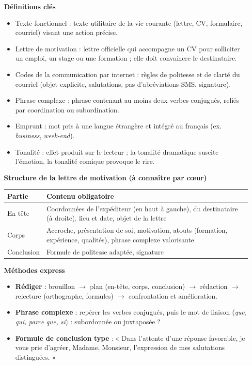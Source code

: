 \documentclass[11pt]{article}
\newcommand{\cle}[1]{{\popxbold\color{popdark}#1}}
\begin{document}
\begin{bilan}
\textbf{Définitions clés}
\begin{itemize}
  \item \cle{Texte fonctionnel} : texte utilitaire de la vie courante (lettre, CV, formulaire, courriel) visant une action précise.
  \item \cle{Lettre de motivation} : lettre officielle qui accompagne un CV pour solliciter un emploi, un stage ou une formation ; elle doit convaincre le destinataire.
  \item \cle{Codes de la communication par internet} : règles de politesse et de clarté du courriel (objet explicite, salutations, pas d'abréviations SMS, signature).
  \item \cle{Phrase complexe} : phrase contenant au moins deux verbes conjugués, reliés par coordination ou subordination.
  \item \cle{Emprunt} : mot pris à une langue étrangère et intégré au français (ex. \emph{business}, \emph{week-end}).
  \item \cle{Tonalité} : effet produit sur le lecteur ; la tonalité \cle{dramatique} suscite l'émotion, la tonalité \cle{comique} provoque le rire.
\end{itemize}

\textbf{Structure de la lettre de motivation (à connaître par cœur)}
\begin{center}
\begin{tabularx}{\linewidth}{|l|X|}
\hline
\rowcolor{popblueL} \textbf{Partie} & \textbf{Contenu obligatoire} \\
\hline
En-tête & Coordonnées de l'expéditeur (en haut à gauche), du destinataire (à droite), lieu et date, objet de la lettre \\
\hline
Corps & Accroche, présentation de soi, motivation, atouts (formation, expérience, qualités), phrase complexe valorisante \\
\hline
Conclusion & Formule de politesse adaptée, signature \\
\hline
\end{tabularx}
\end{center}

\textbf{Méthodes express}
\begin{itemize}
  \item \textbf{Rédiger} : brouillon $\rightarrow$ plan (en-tête, corps, conclusion) $\rightarrow$ rédaction $\rightarrow$ relecture (orthographe, formules) $\rightarrow$ confrontation et amélioration.
  \item \textbf{Phrase complexe} : repérer les verbes conjugués, puis le mot de liaison (\emph{que, qui, parce que, si}) : subordonnée ou juxtaposée ?
  \item \textbf{Formule de conclusion type} : « Dans l'attente d'une réponse favorable, je vous prie d'agréer, Madame, Monsieur, l'expression de mes salutations distinguées. »
\end{itemize}
\end{bilan}
\end{document}
